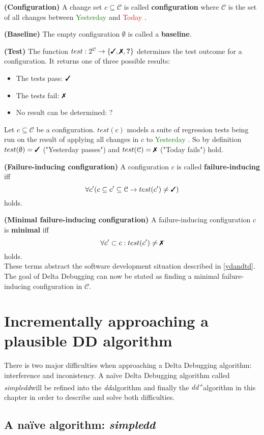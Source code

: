\documentclass[a4paper,UKenglish]{lipics-v2018}
\newcommand{\sdd}[0]{\textit{simpledd}}
\newcommand{\dd}[0]{\textit{dd}}
\newcommand{\ddp}{\textit{dd\textsuperscript{+}}}
\newcommand{\green}[1]{\textcolor{green}{#1}}
\newcommand{\red}[1]{\textcolor{red}{#1}}
\newcommand{\yd}[0]{\green{Yesterday} }
\newcommand{\td}[0]{\red{Today} }
\newcommand{\C}[0]{\ensuremath{\mathcal{C}}}
\newcommand{\cmark}{\text{\ding{51}}}
\newcommand{\xmark}{\text{\ding{55}}}
\newcommand{\qmark}{\textbf{?}}
\newcommand{\defsub}[1]{\textbf{(#1)} }
\newcommand{\set}[1]{\left \{ #1 \right \}}
\begin{document}
 \defsub{Configuration} A change set $c \subseteq \C$ is called \textbf{configuration} where $\C$ is the set of all changes between \yd and \td.

 \defsub{Baseline} The empty configuration $\emptyset$ is called a \textbf{baseline}.

 \defsub{Test} The function $test: 2^{\C} \to \set{\cmark, \xmark, \qmark}$ determines the test outcome for a configuration. It returns one of three possible results: 
\begin{itemize}
	\item The tests pass: $\cmark$
	\item The tests fail: $\xmark$
	\item No result can be determined: $\qmark$
\end{itemize} 

Let $c \subseteq \C$ be a configuration. $test(c)$ models a suite of regression tests being run on the result of applying all changes in $c$ to \yd. So by definition $test(\emptyset) = \cmark$ ("Yesterday passes") and $test(\C) = \xmark$ ("Today fails") hold.

 \defsub{Failure-inducing configuration} A configuration $c$ is called \textbf{failure-inducing} iff 
\[ \forall c' (c \subseteq c' \subseteq \C \rightarrow test(c') \ne \cmark) \] 
holds.

 \defsub{Minimal failure-inducing configuration} A failure-inducing configuration $c$ is \textbf{minimal} iff 
\[ \forall c' \subset c: test(c') \ne \xmark \]
holds.\\


These terms abstract the software development situation described in \ref{ydandtd}. The goal of Delta Debugging can now be stated as finding a minimal failure-inducing configuration in $\C$.

\section{Incrementally approaching a plausible DD algorithm}

There is two major difficulties when approaching a Delta Debugging algorithm: interference and inconistency. A na\"ive Delta Debugging algorithm called \sdd will be refined into the \dd algorithm and finally the \ddp algorithm in this chapter in order to describe and solve both difficulties. 

\subsection{A na\"ive algorithm: \sdd}
\end{document}
